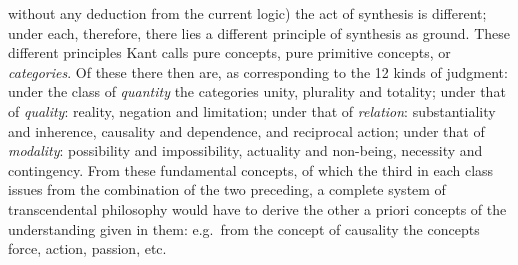 without any deduction from the current logic) the act of synthesis is
different; under each, therefore, there lies a different principle of
synthesis as ground. These different principles Kant calls pure concepts,
pure primitive concepts, or \emph{categories}. Of these there then are,
as corresponding to the 12 kinds of judgment: under the class of
\emph{quantity} the categories unity, plurality and totality; under that
of \emph{quality}: reality, negation and limitation; under that of
\emph{relation}: substantiality and inherence, causality and dependence,
and reciprocal action; under that of \emph{modality}: possibility and
impossibility, actuality and non-being, necessity and contingency. From
these fundamental concepts, of which the third in each class issues from
the combination of the two preceding, a complete system of transcendental
philosophy would have to derive the other a priori concepts of the
understanding given in them: e.g.\ from the concept of causality the
concepts force, action, passion, etc.

